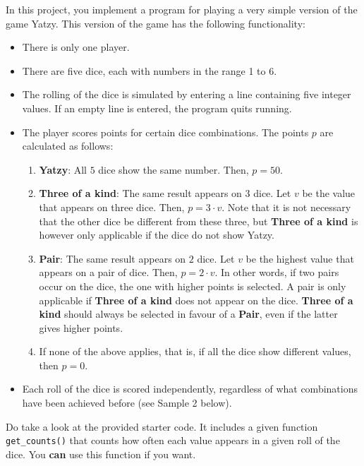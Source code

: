 
In this project, you implement a program for playing a very simple version of the game Yatzy.
This version of the game has the following functionality:
\begin{itemize}
    \item There is only one player.
    \item There are five dice, each with numbers in the range 1 to 6.
    \item The rolling of the dice is simulated by entering a line containing five integer values.
    If an empty line is entered, the program quits running.
    \item The player scores points for certain dice combinations.
    The points $p$ are calculated as follows:
    \begin{enumerate}
        \item \textbf{Yatzy}: All $5$ dice show the same number. Then, $p = 50$.
        \item \textbf{Three of a kind}: The same result appears on $3$ dice.
        Let $v$ be the value that appears on three dice. Then, $p = 3 \cdot v$.
        Note that it is not necessary that the other dice be different from these three,
        but \textbf{Three of a kind} is however only applicable if the dice do not show Yatzy.
        \item \textbf{Pair}: The same result appears on $2$ dice.
        Let $v$ be the highest value that appears on a pair of dice. Then, $p = 2 \cdot v$.
        In other words, if two pairs occur on the dice, the one with higher points is selected.
        A pair is only applicable if \textbf{Three of a kind} does not appear on the dice.
        \textbf{Three of a kind} should always be selected in favour of a \textbf{Pair},
        even if the latter gives higher points.
        \item If none of the above applies, that is, if all the dice show different values, then $p=0$.
    \end{enumerate}
    \item Each roll of the dice is scored independently, regardless of what combinations have been achieved before (see Sample 2 below).
\end{itemize}

Do take a look at the provided starter code.
It includes a given function \texttt{get\_counts()}
that counts how often each value appears in a given roll of the dice.
You \textbf{can} use this function if you want.

